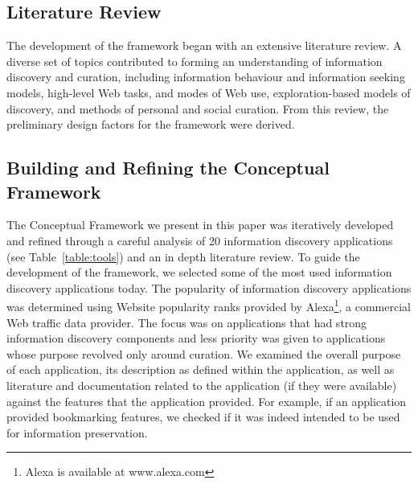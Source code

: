 \documentclass{sigchi}
\begin{document}
{\subsection{Literature Review}
\label{subsection:lit_review}
The development of the framework began with an extensive literature review. A diverse set of topics contributed to forming an understanding of information discovery and curation, including information behaviour and information seeking models, high-level Web tasks, and modes of Web use, exploration-based models of discovery, and methods of personal and social curation. From this review, the preliminary design factors for the framework were derived.
}%

{\subsection{Building and Refining the Conceptual Framework}
\label{subsection:building}
The Conceptual Framework we present in this paper was iteratively developed and refined through a careful analysis of 20 information discovery applications (see Table~\ref{table:tools}) and an in depth literature review.   
%
To guide the development of the framework, we selected some of the most used information discovery applications today.
The popularity of information discovery applications was determined using Website popularity ranks provided by Alexa\footnote[1]{Alexa is available at www.alexa.com}, a commercial Web traffic data provider. The focus was on applications that had strong information discovery components and less priority was given to applications whose purpose revolved only around curation.
%
We examined the overall purpose of each application, its description as defined within the application, as well as literature and documentation related to the application (if they were available) against the features that the application provided. For example, if an application provided bookmarking features, we checked if it was indeed intended to be used for information preservation. 

}
\end{document}
